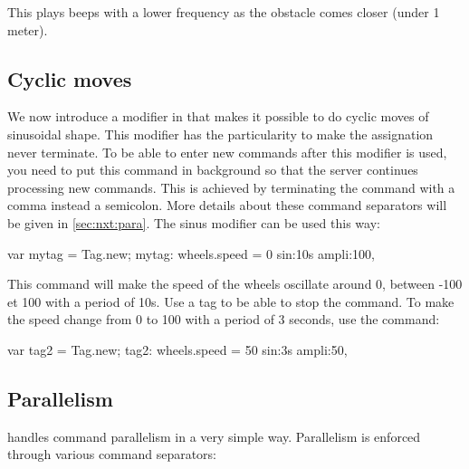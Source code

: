This plays beeps with a lower frequency as the obstacle comes closer (under 1
meter).

\subsection{Cyclic moves}
We now introduce a modifier in \urbi that makes it possible to do cyclic moves
of sinusoidal shape. This modifier has the particularity to make the
assignation never terminate. To be able to enter new commands after this
modifier is used, you need to put this command in background so that the \urbi
server continues processing new commands. This is achieved by terminating the
command with a comma instead a semicolon. More details about these command
separators will be given in \autoref{sec:nxt:para}.
The sinus modifier can be used this way:
\begin{urbiunchecked}
  var mytag = Tag.new;
  mytag: wheels.speed = 0 sin:10s ampli:100,
\end{urbiunchecked}

This command will make the speed of the wheels oscillate around 0, between -100
et 100 with a period of 10s. Use a tag to be able to stop the command. To make
the speed change from 0 to 100 with a period of 3 seconds, use the command:
\begin{urbiunchecked}
  var tag2 = Tag.new;
  tag2: wheels.speed = 50 sin:3s ampli:50,
\end{urbiunchecked}



\subsection{Parallelism}
\label{sec:nxt:para}
\urbi handles command parallelism in a very simple way. Parallelism is enforced
through various command separators:


